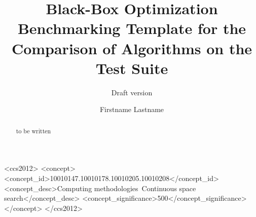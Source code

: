 \documentclass[sigconf]{acmart}
\begin{document}
\title{Black-Box Optimization Benchmarking Template for the Comparison of Algorithms on the \bbob Test Suite}
\renewcommand{\shorttitle}{Black-Box Optimization Benchmarking Template for \bbob Test Suite}
\subtitle{Draft version}


\author{Firstname Lastname}
%
%
%
%
%
%
%

\renewcommand{\shortauthors}{Firstname Lastname et. al.}


\begin{abstract}
to be written
\end{abstract}


%
%
 \begin{CCSXML}
<ccs2012>
<concept>
<concept_id>10010147.10010178.10010205.10010208</concept_id>
<concept_desc>Computing methodologies~Continuous space search</concept_desc>
<concept_significance>500</concept_significance>
</concept>
</ccs2012>
\end{CCSXML}
\end{document}
